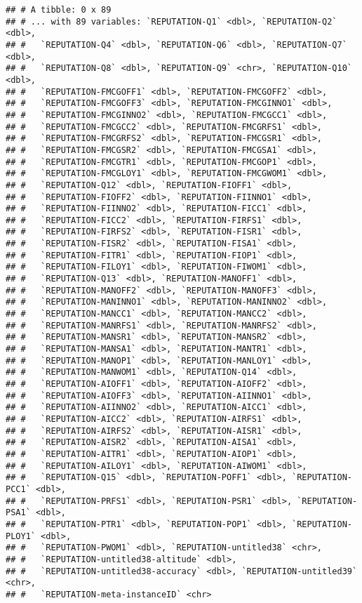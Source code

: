 \documentclass[
]{article}
\begin{document}
\begin{verbatim}
## # A tibble: 0 x 89
## # ... with 89 variables: `REPUTATION-Q1` <dbl>, `REPUTATION-Q2` <dbl>,
## #   `REPUTATION-Q4` <dbl>, `REPUTATION-Q6` <dbl>, `REPUTATION-Q7` <dbl>,
## #   `REPUTATION-Q8` <dbl>, `REPUTATION-Q9` <chr>, `REPUTATION-Q10` <dbl>,
## #   `REPUTATION-FMCGOFF1` <dbl>, `REPUTATION-FMCGOFF2` <dbl>,
## #   `REPUTATION-FMCGOFF3` <dbl>, `REPUTATION-FMCGINNO1` <dbl>,
## #   `REPUTATION-FMCGINNO2` <dbl>, `REPUTATION-FMCGCC1` <dbl>,
## #   `REPUTATION-FMCGCC2` <dbl>, `REPUTATION-FMCGRFS1` <dbl>,
## #   `REPUTATION-FMCGRFS2` <dbl>, `REPUTATION-FMCGSR1` <dbl>,
## #   `REPUTATION-FMCGSR2` <dbl>, `REPUTATION-FMCGSA1` <dbl>,
## #   `REPUTATION-FMCGTR1` <dbl>, `REPUTATION-FMCGOP1` <dbl>,
## #   `REPUTATION-FMCGLOY1` <dbl>, `REPUTATION-FMCGWOM1` <dbl>,
## #   `REPUTATION-Q12` <dbl>, `REPUTATION-FIOFF1` <dbl>,
## #   `REPUTATION-FIOFF2` <dbl>, `REPUTATION-FIINNO1` <dbl>,
## #   `REPUTATION-FIINNO2` <dbl>, `REPUTATION-FICC1` <dbl>,
## #   `REPUTATION-FICC2` <dbl>, `REPUTATION-FIRFS1` <dbl>,
## #   `REPUTATION-FIRFS2` <dbl>, `REPUTATION-FISR1` <dbl>,
## #   `REPUTATION-FISR2` <dbl>, `REPUTATION-FISA1` <dbl>,
## #   `REPUTATION-FITR1` <dbl>, `REPUTATION-FIOP1` <dbl>,
## #   `REPUTATION-FILOY1` <dbl>, `REPUTATION-FIWOM1` <dbl>,
## #   `REPUTATION-Q13` <dbl>, `REPUTATION-MANOFF1` <dbl>,
## #   `REPUTATION-MANOFF2` <dbl>, `REPUTATION-MANOFF3` <dbl>,
## #   `REPUTATION-MANINNO1` <dbl>, `REPUTATION-MANINNO2` <dbl>,
## #   `REPUTATION-MANCC1` <dbl>, `REPUTATION-MANCC2` <dbl>,
## #   `REPUTATION-MANRFS1` <dbl>, `REPUTATION-MANRFS2` <dbl>,
## #   `REPUTATION-MANSR1` <dbl>, `REPUTATION-MANSR2` <dbl>,
## #   `REPUTATION-MANSA1` <dbl>, `REPUTATION-MANTR1` <dbl>,
## #   `REPUTATION-MANOP1` <dbl>, `REPUTATION-MANLOY1` <dbl>,
## #   `REPUTATION-MANWOM1` <dbl>, `REPUTATION-Q14` <dbl>,
## #   `REPUTATION-AIOFF1` <dbl>, `REPUTATION-AIOFF2` <dbl>,
## #   `REPUTATION-AIOFF3` <dbl>, `REPUTATION-AIINNO1` <dbl>,
## #   `REPUTATION-AIINNO2` <dbl>, `REPUTATION-AICC1` <dbl>,
## #   `REPUTATION-AICC2` <dbl>, `REPUTATION-AIRFS1` <dbl>,
## #   `REPUTATION-AIRFS2` <dbl>, `REPUTATION-AISR1` <dbl>,
## #   `REPUTATION-AISR2` <dbl>, `REPUTATION-AISA1` <dbl>,
## #   `REPUTATION-AITR1` <dbl>, `REPUTATION-AIOP1` <dbl>,
## #   `REPUTATION-AILOY1` <dbl>, `REPUTATION-AIWOM1` <dbl>,
## #   `REPUTATION-Q15` <dbl>, `REPUTATION-POFF1` <dbl>, `REPUTATION-PCC1` <dbl>,
## #   `REPUTATION-PRFS1` <dbl>, `REPUTATION-PSR1` <dbl>, `REPUTATION-PSA1` <dbl>,
## #   `REPUTATION-PTR1` <dbl>, `REPUTATION-POP1` <dbl>, `REPUTATION-PLOY1` <dbl>,
## #   `REPUTATION-PWOM1` <dbl>, `REPUTATION-untitled38` <chr>,
## #   `REPUTATION-untitled38-altitude` <dbl>,
## #   `REPUTATION-untitled38-accuracy` <dbl>, `REPUTATION-untitled39` <chr>,
## #   `REPUTATION-meta-instanceID` <chr>
\end{verbatim}
\end{document}
